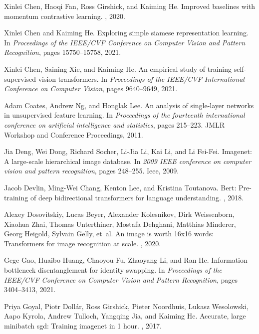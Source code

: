 \documentclass[10pt,twocolumn,letterpaper]{article}
\begin{document}
\begin{thebibliography}{10}
	Xinlei Chen, Haoqi Fan, Ross Girshick, and Kaiming He.
	\newblock Improved baselines with momentum contrastive learning.
	, 2020.
	
	Xinlei Chen and Kaiming He.
	\newblock Exploring simple siamese representation learning.
	\newblock In {\em Proceedings of the IEEE/CVF Conference on Computer Vision and
		Pattern Recognition}, pages 15750--15758, 2021.
	
	Xinlei Chen, Saining Xie, and Kaiming He.
	\newblock An empirical study of training self-supervised vision transformers.
	\newblock In {\em Proceedings of the IEEE/CVF International Conference on
		Computer Vision}, pages 9640--9649, 2021.
	
	Adam Coates, Andrew Ng, and Honglak Lee.
	\newblock An analysis of single-layer networks in unsupervised feature
	learning.
	\newblock In {\em Proceedings of the fourteenth international conference on
		artificial intelligence and statistics}, pages 215--223. JMLR Workshop and
	Conference Proceedings, 2011.
	
	Jia Deng, Wei Dong, Richard Socher, Li-Jia Li, Kai Li, and Li Fei-Fei.
	\newblock Imagenet: A large-scale hierarchical image database.
	\newblock In {\em 2009 IEEE conference on computer vision and pattern
		recognition}, pages 248--255. Ieee, 2009.
	
	Jacob Devlin, Ming-Wei Chang, Kenton Lee, and Kristina Toutanova.
	\newblock Bert: Pre-training of deep bidirectional transformers for language
	understanding.
	, 2018.
	
	Alexey Dosovitskiy, Lucas Beyer, Alexander Kolesnikov, Dirk Weissenborn,
	Xiaohua Zhai, Thomas Unterthiner, Mostafa Dehghani, Matthias Minderer, Georg
	Heigold, Sylvain Gelly, et~al.
	\newblock An image is worth 16x16 words: Transformers for image recognition at
	scale.
	, 2020.
	
	Gege Gao, Huaibo Huang, Chaoyou Fu, Zhaoyang Li, and Ran He.
	\newblock Information bottleneck disentanglement for identity swapping.
	\newblock In {\em Proceedings of the IEEE/CVF Conference on Computer Vision and
		Pattern Recognition}, pages 3404--3413, 2021.
	
	Priya Goyal, Piotr Doll{\'a}r, Ross Girshick, Pieter Noordhuis, Lukasz
	Wesolowski, Aapo Kyrola, Andrew Tulloch, Yangqing Jia, and Kaiming He.
	\newblock Accurate, large minibatch sgd: Training imagenet in 1 hour.
	, 2017.
	

\end{thebibliography}
\end{document}
